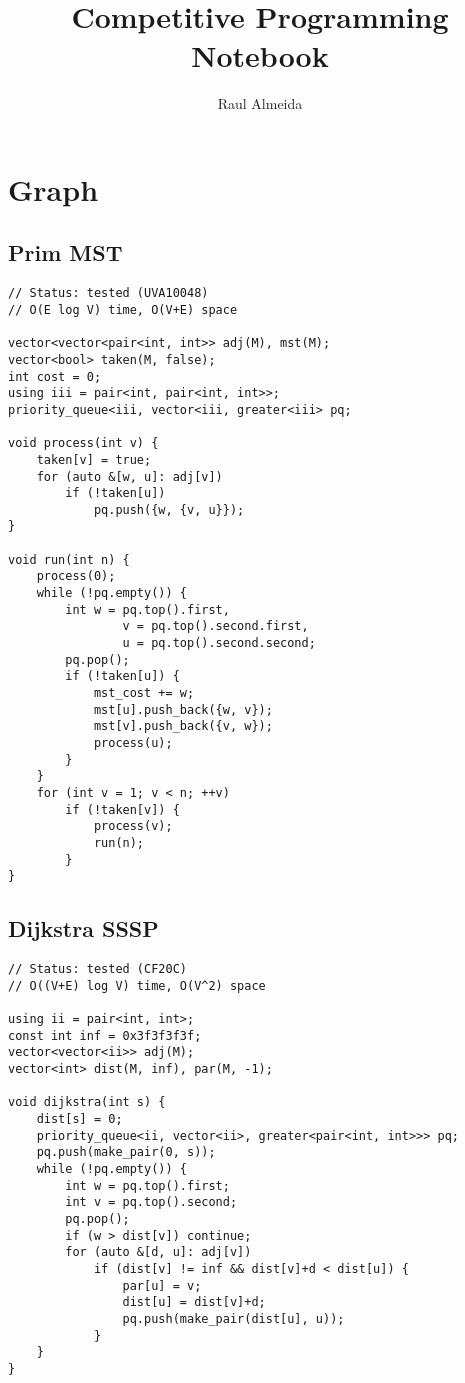 \documentclass[12pt, a4paper, twoside]{article}
\title{Competitive Programming Notebook}
\author{Raul Almeida}
\begin{document}
\twocolumn
\date{}
\maketitle

\tableofcontents


\section{Graph}

\subsection{Prim MST}
\begin{lstlisting}
// Status: tested (UVA10048)
// O(E log V) time, O(V+E) space

vector<vector<pair<int, int>> adj(M), mst(M);
vector<bool> taken(M, false);
int cost = 0;
using iii = pair<int, pair<int, int>>;
priority_queue<iii, vector<iii, greater<iii> pq;

void process(int v) {
	taken[v] = true;
	for (auto &[w, u]: adj[v])
		if (!taken[u])
			pq.push({w, {v, u}});
}

void run(int n) {
	process(0);
	while (!pq.empty()) {
		int w = pq.top().first,
				v = pq.top().second.first,
				u = pq.top().second.second;
		pq.pop();
		if (!taken[u]) {
			mst_cost += w;
			mst[u].push_back({w, v});
			mst[v].push_back({v, w});
			process(u);
		}
	}
	for (int v = 1; v < n; ++v)
		if (!taken[v]) {
			process(v);
			run(n);
		}
}
\end{lstlisting}

\subsection{Dijkstra SSSP}
\begin{lstlisting}
// Status: tested (CF20C)
// O((V+E) log V) time, O(V^2) space

using ii = pair<int, int>;
const int inf = 0x3f3f3f3f;
vector<vector<ii>> adj(M);
vector<int> dist(M, inf), par(M, -1);

void dijkstra(int s) {
	dist[s] = 0;
	priority_queue<ii, vector<ii>, greater<pair<int, int>>> pq;
	pq.push(make_pair(0, s));
	while (!pq.empty()) {
		int w = pq.top().first;
		int v = pq.top().second;
		pq.pop();
		if (w > dist[v]) continue;
		for (auto &[d, u]: adj[v])
			if (dist[v] != inf && dist[v]+d < dist[u]) {
				par[u] = v;
				dist[u] = dist[v]+d;
				pq.push(make_pair(dist[u], u));
			}
	}
}
\end{lstlisting}
\end{document}
